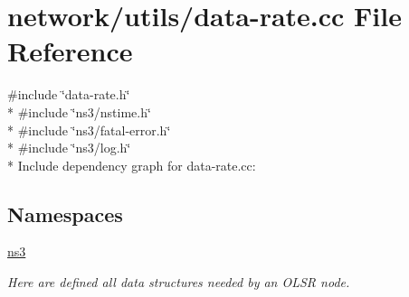 \hypertarget{data-rate_8cc}{}\section{network/utils/data-\/rate.cc File Reference}
\label{data-rate_8cc}
{\ttfamily \#include \char`\"{}data-\/rate.\+h\char`\"{}}\\*
{\ttfamily \#include \char`\"{}ns3/nstime.\+h\char`\"{}}\\*
{\ttfamily \#include \char`\"{}ns3/fatal-\/error.\+h\char`\"{}}\\*
{\ttfamily \#include \char`\"{}ns3/log.\+h\char`\"{}}\\*
Include dependency graph for data-\/rate.cc\+:
\subsection*{Namespaces}
\begin{DoxyCompactItemize}
\item 
 \hyperlink{namespacens3}{ns3}
\begin{DoxyCompactList}\small\item\em Here are defined all data structures needed by an O\+L\+SR node. \end{DoxyCompactList}\end{DoxyCompactItemize}
